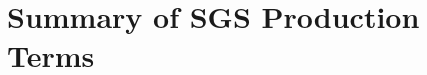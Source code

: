 \newcommand{\filtomega}{%
    \widetilde{\mathbf{\omega}}
    }
\newcommand{\filtS}{%
    \widetilde{\mathbf{S}}
    }
\newcommand{\filtR}{%
    \widetilde{\mathbf{R}}
    }
\newcommand{\filtvar}[1]{%
    \widetilde{#1}
    }
\section{Summary of SGS Production Terms}




